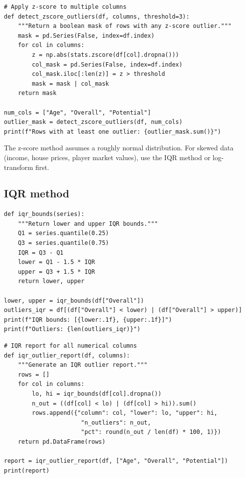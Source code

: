\begin{verbatim}
# Apply z-score to multiple columns
def detect_zscore_outliers(df, columns, threshold=3):
    """Return a boolean mask of rows with any z-score outlier."""
    mask = pd.Series(False, index=df.index)
    for col in columns:
        z = np.abs(stats.zscore(df[col].dropna()))
        col_mask = pd.Series(False, index=df.index)
        col_mask.iloc[:len(z)] = z > threshold
        mask = mask | col_mask
    return mask

num_cols = ["Age", "Overall", "Potential"]
outlier_mask = detect_zscore_outliers(df, num_cols)
print(f"Rows with at least one outlier: {outlier_mask.sum()}")
\end{verbatim}

\begin{datatip}
The z-score method assumes a roughly normal distribution. For skewed data (income, house prices, player market values), use the IQR method or log-transform first.
\end{datatip}

\subsection{IQR method}

\begin{verbatim}
def iqr_bounds(series):
    """Return lower and upper IQR bounds."""
    Q1 = series.quantile(0.25)
    Q3 = series.quantile(0.75)
    IQR = Q3 - Q1
    lower = Q1 - 1.5 * IQR
    upper = Q3 + 1.5 * IQR
    return lower, upper

lower, upper = iqr_bounds(df["Overall"])
outliers_iqr = df[(df["Overall"] < lower) | (df["Overall"] > upper)]
print(f"IQR bounds: [{lower:.1f}, {upper:.1f}]")
print(f"Outliers: {len(outliers_iqr)}")
\end{verbatim}

\begin{verbatim}
# IQR report for all numerical columns
def iqr_outlier_report(df, columns):
    """Generate an IQR outlier report."""
    rows = []
    for col in columns:
        lo, hi = iqr_bounds(df[col].dropna())
        n_out = ((df[col] < lo) | (df[col] > hi)).sum()
        rows.append({"column": col, "lower": lo, "upper": hi,
                      "n_outliers": n_out,
                      "pct": round(n_out / len(df) * 100, 1)})
    return pd.DataFrame(rows)

report = iqr_outlier_report(df, ["Age", "Overall", "Potential"])
print(report)
\end{verbatim}

